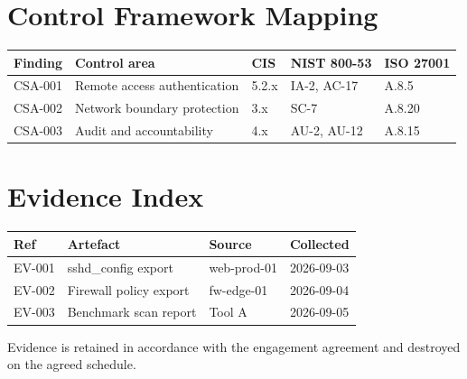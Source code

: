 \documentclass[11pt,a4paper]{article}
\begin{document}
\section{Control Framework Mapping}
\begin{longtable}{@{}l p{4.6cm} l l l@{}}
\toprule
\textbf{Finding} & \textbf{Control area} & \textbf{CIS} & \textbf{NIST 800-53} & \textbf{ISO 27001} \\
\midrule\endhead
CSA-001 & Remote access authentication & 5.2.x & IA-2, AC-17 & A.8.5 \\
CSA-002 & Network boundary protection & 3.x & SC-7 & A.8.20 \\
CSA-003 & Audit and accountability & 4.x & AU-2, AU-12 & A.8.15 \\
\bottomrule
\end{longtable}

\section{Evidence Index}
\begin{longtable}{@{}l p{5.6cm} l l@{}}
\toprule
\textbf{Ref} & \textbf{Artefact} & \textbf{Source} & \textbf{Collected} \\
\midrule\endhead
EV-001 & sshd\_config export & web-prod-01 & 2026-09-03 \\
EV-002 & Firewall policy export & fw-edge-01 & 2026-09-04 \\
EV-003 & Benchmark scan report & Tool A & 2026-09-05 \\
\bottomrule
\end{longtable}

\noindent\footnotesize Evidence is retained in accordance with the engagement
agreement and destroyed on the agreed schedule.
\end{document}
